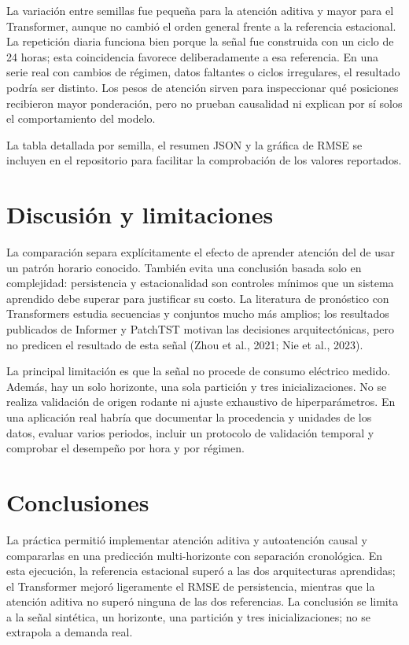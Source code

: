 \documentclass[12pt]{article}
\begin{document}
La variación entre semillas fue pequeña para la atención aditiva y mayor para el Transformer, aunque no cambió el orden general frente a la referencia estacional. La repetición diaria funciona bien porque la señal fue construida con un ciclo de 24 horas; esta coincidencia favorece deliberadamente a esa referencia. En una serie real con cambios de régimen, datos faltantes o ciclos irregulares, el resultado podría ser distinto. Los pesos de atención sirven para inspeccionar qué posiciones recibieron mayor ponderación, pero no prueban causalidad ni explican por sí solos el comportamiento del modelo.

La tabla detallada por semilla, el resumen JSON y la gráfica de RMSE se incluyen en el repositorio para facilitar la comprobación de los valores reportados.

\section{Discusión y limitaciones}
La comparación separa explícitamente el efecto de aprender atención del de usar un patrón horario conocido. También evita una conclusión basada solo en complejidad: persistencia y estacionalidad son controles mínimos que un sistema aprendido debe superar para justificar su costo. La literatura de pronóstico con Transformers estudia secuencias y conjuntos mucho más amplios; los resultados publicados de Informer y PatchTST motivan las decisiones arquitectónicas, pero no predicen el resultado de esta señal (Zhou et al., 2021; Nie et al., 2023).

La principal limitación es que la señal no procede de consumo eléctrico medido. Además, hay un solo horizonte, una sola partición y tres inicializaciones. No se realiza validación de origen rodante ni ajuste exhaustivo de hiperparámetros. En una aplicación real habría que documentar la procedencia y unidades de los datos, evaluar varios periodos, incluir un protocolo de validación temporal y comprobar el desempeño por hora y por régimen.

\section{Conclusiones}
La práctica permitió implementar atención aditiva y autoatención causal y compararlas en una predicción multi-horizonte con separación cronológica. En esta ejecución, la referencia estacional superó a las dos arquitecturas aprendidas; el Transformer mejoró ligeramente el RMSE de persistencia, mientras que la atención aditiva no superó ninguna de las dos referencias. La conclusión se limita a la señal sintética, un horizonte, una partición y tres inicializaciones; no se extrapola a demanda real.
\end{document}
